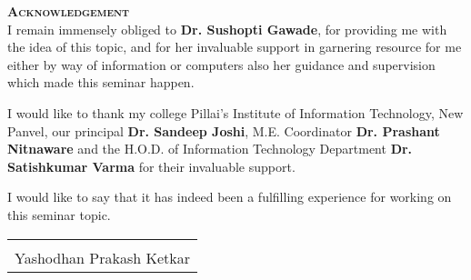 {\centering \bf \LARGE \scshape
    Acknowledgement \\
}
\vspace{1em} \noindent
I remain immensely obliged to \textbf{Dr. Sushopti Gawade}, for providing me with the idea of this topic,
and for her invaluable support in garnering resource for me either by way of information
or computers also her guidance and supervision which made this seminar happen.

\noindent
I would like to thank my college Pillai's Institute of Information Technology, New Panvel,
our principal \textbf{Dr. Sandeep Joshi}, M.E. Coordinator \textbf{Dr. Prashant Nitnaware} and 
the H.O.D. of Information Technology Department \textbf{Dr. Satishkumar Varma} for their invaluable support.

\noindent
I would like to say that it has indeed been a fulfilling experience for working on this seminar topic.

\vspace{7.5em}
\begin{flushright}
\begin{tabular}{c}
\hline\\
Yashodhan Prakash Ketkar\\
\end{tabular}
\end{flushright}